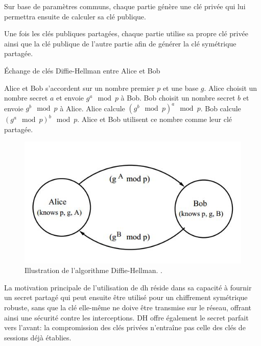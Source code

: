 Sur base de paramètres communs, chaque partie génère une clé privée qui lui permettra ensuite de calculer sa clé publique.

Une fois les clés publiques partagées, chaque partie utilise sa propre clé privée ainsi que la clé publique de l'autre partie afin de générer la clé symétrique partagée.

\begin{algorithm}
  \caption{Échange de clés Diffie-Hellman entre Alice et Bob}
  \begin{algorithmic}[1]
    \State Alice et Bob s'accordent sur un nombre premier $p$ et une base $g$.
    \State Alice choisit un nombre secret $a$ et envoie $g^a \mod p$ à Bob.
    \State Bob choisit un nombre secret $b$ et envoie $g^b \mod p$ à Alice.
    \State Alice calcule $(g^b \mod p)^a \mod p$.
    \State Bob calcule $(g^a \mod p)^b \mod p$.
    \State Alice et Bob utilisent ce nombre comme leur clé partagée.
  \end{algorithmic}
\end{algorithm}

\begin{figure}[h!]
  \centering
  \includegraphics[width=0.7\linewidth]{Images/OR/dh.jpg}
  \caption{Illustration de l'algorithme Diffie-Hellman. \cite[Diffie-Hellman Algorithm.]{spider_diffie-hellman_2024}.}
  \label{fig:dh}
\end{figure}

La motivation principale de l'utilisation de \acrshort{dh} réside dans sa capacité à fournir un secret partagé qui peut ensuite être utilisé pour un chiffrement symétrique robuste, sans que la clé elle-même ne doive être transmise sur le réseau, offrant ainsi une sécurité contre les interceptions.
DH offre également le secret parfait vers l'avant: la compromission des clés privées n'entraîne pas celle des clés de sessions déjà établies.


